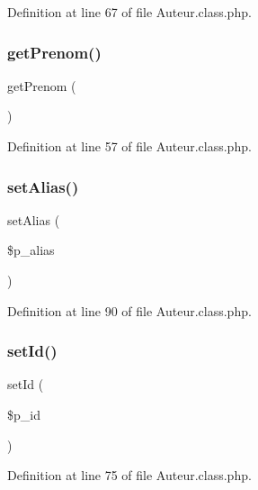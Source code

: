 Definition at line 67 of file Auteur.\+class.\+php.

\mbox{\label{class_auteur_a2a243ff78ccebcd417fd644325f44701}} 
\subsubsection{\texorpdfstring{get\+Prenom()}{getPrenom()}}
{\footnotesize\ttfamily get\+Prenom (\begin{DoxyParamCaption}{ }\end{DoxyParamCaption})}



Definition at line 57 of file Auteur.\+class.\+php.

\mbox{\label{class_auteur_aba4651b9d142badba3890fbca4fefbdf}} 
\subsubsection{\texorpdfstring{set\+Alias()}{setAlias()}}
{\footnotesize\ttfamily set\+Alias (\begin{DoxyParamCaption}\item[{}]{\$p\+\_\+alias }\end{DoxyParamCaption})}



Definition at line 90 of file Auteur.\+class.\+php.

\mbox{\label{class_auteur_ab2fff0fc655f96b6e5f4fcc294c49eee}} 
\subsubsection{\texorpdfstring{set\+Id()}{setId()}}
{\footnotesize\ttfamily set\+Id (\begin{DoxyParamCaption}\item[{}]{\$p\+\_\+id }\end{DoxyParamCaption})}



Definition at line 75 of file Auteur.\+class.\+php.

\mbox{\label{class_auteur_a64e05abe01ecd950dda832ceb8ad95a9}} 
